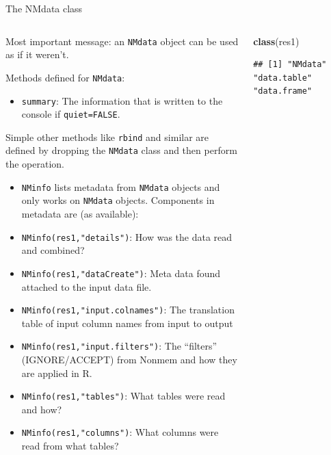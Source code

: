 \documentclass[
  8pt,
  ignorenonframetext,
  aspectratio=169]{beamer}
\newenvironment{Shaded}{\begin{snugshade}}{\end{snugshade}}
\newcommand{\KeywordTok}[1]{\textcolor[rgb]{0.13,0.29,0.53}{\textbf{#1}}}
\newcommand{\NormalTok}[1]{#1}
\providecommand{\tightlist}{%
  \setlength{\itemsep}{0pt}\setlength{\parskip}{0pt}}
\begin{document}
\begin{frame}[fragile]{The NMdata class}
\protect\hypertarget{the-nmdata-class}{}
\begin{columns}[T]
\begin{column}{0.48\textwidth}
Most important message: an \texttt{NMdata} object can be used as if it
weren't.

Methods defined for \texttt{NMdata}:

\begin{itemize}
\tightlist
\item
  \texttt{summary}: The information that is written to the console if
  \texttt{quiet=FALSE}.
\end{itemize}

Simple other methods like \texttt{rbind} and similar are defined by
dropping the \texttt{NMdata} class and then perform the operation.

\begin{itemize}
\tightlist
\item
  \texttt{NMinfo} lists metadata from \texttt{NMdata} objects and only
  works on \texttt{NMdata} objects. Components in metadata are (as
  available):
\item
  \texttt{NMinfo(res1,"details")}: How was the data read and combined?
\item
  \texttt{NMinfo(res1,"dataCreate")}: Meta data found attached to the
  input data file.
\item
  \texttt{NMinfo(res1,"input.colnames")}: The translation table of input
  column names from input to output
\item
  \texttt{NMinfo(res1,"input.filters")}: The ``filters'' (IGNORE/ACCEPT)
  from Nonmem and how they are applied in R.
\item
  \texttt{NMinfo(res1,"tables")}: What tables were read and how?
\item
  \texttt{NMinfo(res1,"columns")}: What columns were read from what
  tables?
\end{itemize}
\end{column}

\begin{column}{0.48\textwidth}
\tiny

\begin{Shaded}
\begin{Highlighting}[]
\KeywordTok{class}\NormalTok{(res1)}
\end{Highlighting}
\end{Shaded}

\begin{verbatim}
## [1] "NMdata"     "data.table" "data.frame"
\end{verbatim}


\end{column}
\end{columns}
\end{frame}
\end{document}
